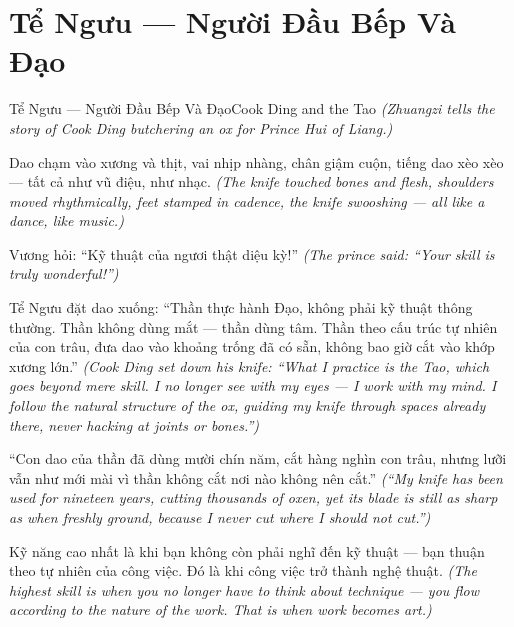 \section{Tể Ngưu — Người Đầu Bếp Và Đạo}
\begin{truyen}{Tể Ngưu — Người Đầu Bếp Và Đạo}{Cook Ding and the Tao}
\textit{(Zhuangzi tells the story of Cook Ding butchering an ox for Prince Hui of Liang.)}

Dao chạm vào xương và thịt, vai nhịp nhàng, chân giậm cuộn, tiếng dao xèo xèo — tất cả như vũ điệu, như nhạc.
\textit{(The knife touched bones and flesh, shoulders moved rhythmically, feet stamped in cadence, the knife swooshing — all like a dance, like music.)}

Vương hỏi: ``Kỹ thuật của ngươi thật diệu kỳ!''
\textit{(The prince said: ``Your skill is truly wonderful!'')}

Tể Ngưu đặt dao xuống: ``Thần thực hành Đạo, không phải kỹ thuật thông thường. Thần không dùng mắt — thần dùng tâm. Thần theo cấu trúc tự nhiên của con trâu, đưa dao vào khoảng trống đã có sẵn, không bao giờ cắt vào khớp xương lớn.''
\textit{(Cook Ding set down his knife: ``What I practice is the Tao, which goes beyond mere skill. I no longer see with my eyes — I work with my mind. I follow the natural structure of the ox, guiding my knife through spaces already there, never hacking at joints or bones.'')}

``Con dao của thần đã dùng mười chín năm, cắt hàng nghìn con trâu, nhưng lưỡi vẫn như mới mài vì thần không cắt nơi nào không nên cắt.''
\textit{(``My knife has been used for nineteen years, cutting thousands of oxen, yet its blade is still as sharp as when freshly ground, because I never cut where I should not cut.'')}

\end{truyen}

\begin{baihoc}
Kỹ năng cao nhất là khi bạn không còn phải nghĩ đến kỹ thuật — bạn thuận theo tự nhiên của công việc. Đó là khi công việc trở thành nghệ thuật.
\textit{(The highest skill is when you no longer have to think about technique — you flow according to the nature of the work. That is when work becomes art.)}
\end{baihoc}
\ngancach

